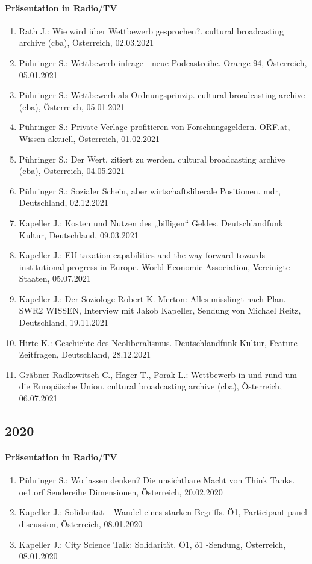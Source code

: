 \paragraph{Präsentation in Radio/TV}
\begin{enumerate}
	\item Rath J.: Wie wird über Wettbewerb gesprochen?. cultural broadcasting archive (cba), Österreich, 02.03.2021
	\item Pühringer S.: Wettbewerb infrage - neue Podcastreihe. Orange 94, Österreich, 05.01.2021
	\item Pühringer S.: Wettbewerb als Ordnungsprinzip. cultural broadcasting archive (cba), Österreich, 05.01.2021
	\item Pühringer S.: Private Verlage profitieren von Forschungsgeldern. ORF.at, Wissen aktuell, Österreich, 01.02.2021
	\item Pühringer S.: Der Wert, zitiert zu werden. cultural broadcasting archive (cba), Österreich, 04.05.2021
	\item Pühringer S.: Sozialer Schein, aber wirtschaftsliberale Positionen. mdr, Deutschland, 02.12.2021
	\item Kapeller J.: Kosten und Nutzen des „billigen“ Geldes. Deutschlandfunk Kultur, Deutschland, 09.03.2021
	\item Kapeller J.: EU taxation capabilities and the way forward towards institutional progress in Europe. World Economic Association, Vereinigte Staaten, 05.07.2021
	\item Kapeller J.: Der Soziologe Robert K. Merton: Alles misslingt nach Plan. SWR2 WISSEN, Interview mit Jakob Kapeller, Sendung von Michael Reitz, Deutschland, 19.11.2021
	\item Hirte K.: Geschichte des Neoliberalismus. Deutschlandfunk Kultur, Feature-Zeitfragen, Deutschland, 28.12.2021
	\item Gräbner-Radkowitsch C., Hager T., Porak L.: Wettbewerb in und rund um die Europäische Union. cultural broadcasting archive (cba), Österreich, 06.07.2021
\end{enumerate}
\subsection*{2020}
\paragraph{Präsentation in Radio/TV}
\begin{enumerate}
	\item Pühringer S.: Wo lassen denken? Die unsichtbare Macht von Think Tanks. oe1.orf Sendereihe Dimensionen, Österreich, 20.02.2020
	\item Kapeller J.: Solidarität – Wandel eines starken Begriffs. Ö1, Participant panel discussion, Österreich, 08.01.2020
	\item Kapeller J.: City Science Talk: Solidarität. Ö1, ö1  -Sendung, Österreich, 08.01.2020
\end{enumerate}
